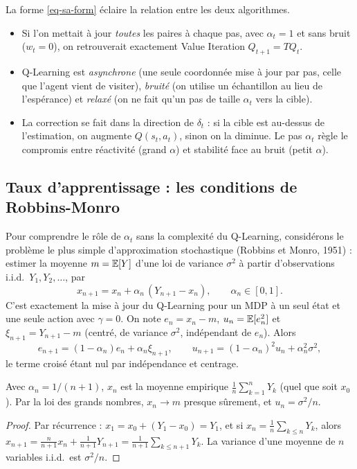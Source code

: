 La forme \eqref{eq-sa-form} éclaire la relation entre les deux algorithmes.
\begin{itemize}
\item Si l'on mettait à jour \emph{toutes} les paires à chaque pas, avec $\alpha_t=1$ et sans bruit ($w_t=0$), on retrouverait exactement Value Iteration $Q_{t+1}=TQ_t$.
\item Q-Learning est \emph{asynchrone} (une seule coordonnée mise à jour par pas, celle que l'agent vient de visiter), \emph{bruité} (on utilise un échantillon au lieu de l'espérance) et \emph{relaxé} (on ne fait qu'un pas de taille $\alpha_t$ vers la cible).
\item La correction se fait dans la direction de $\delta_t$ : si la cible est au-dessus de l'estimation, on augmente $Q(s_t,a_t)$, sinon on la diminue. Le pas $\alpha_t$ règle le compromis entre réactivité (grand $\alpha$) et stabilité face au bruit (petit $\alpha$).
\end{itemize}

\subsection{Taux d'apprentissage : les conditions de Robbins-Monro}\label{sec-rm}

Pour comprendre le rôle de $\alpha_t$ sans la complexité du Q-Learning, considérons le problème le plus simple d'approximation stochastique (Robbins et Monro, 1951) : estimer la moyenne $m=\mathbb{E}[Y]$ d'une loi de variance $\sigma^2$ à partir d'observations i.i.d.\ $Y_1,Y_2,\dots$, par
\begin{equation}\label{eq-rm-scalaire}
x_{n+1}=x_n+\alpha_n\,(Y_{n+1}-x_n),\qquad\alpha_n\in[0,1].
\end{equation}
C'est exactement la mise à jour du Q-Learning pour un MDP à un seul état et une seule action avec $\gamma=0$. On note $e_n=x_n-m$, $u_n=\mathbb{E}[e_n^2]$ et $\xi_{n+1}=Y_{n+1}-m$ (centré, de variance $\sigma^2$, indépendant de $e_n$). Alors
\[
e_{n+1}=(1-\alpha_n)e_n+\alpha_n\xi_{n+1},\qquad u_{n+1}=(1-\alpha_n)^2u_n+\alpha_n^2\sigma^2,
\]
le terme croisé étant nul par indépendance et centrage.

\begin{proposition}[Pas $1/n$]\label{prop-rm-inv}
Avec $\alpha_n=1/(n+1)$, $x_{n}$ est la moyenne empirique $\frac1n\sum_{k=1}^nY_k$ (quel que soit $x_0$). Par la loi des grands nombres, $x_n\to m$ presque sûrement, et $u_n=\sigma^2/n$.
\end{proposition}
\begin{proof}
Par récurrence : $x_1=x_0+(Y_1-x_0)=Y_1$, et si $x_n=\frac1n\sum_{k\le n}Y_k$, alors $x_{n+1}=\frac{n}{n+1}x_n+\frac{1}{n+1}Y_{n+1}=\frac{1}{n+1}\sum_{k\le n+1}Y_k$. La variance d'une moyenne de $n$ variables i.i.d.\ est $\sigma^2/n$.
\end{proof}

